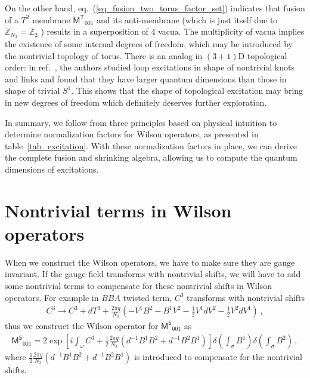 \documentclass[11pt,nofootinbib,preprint]{revtex4-1}
\def\Z{\mathbb{Z}}
\begin{document}
On the other hand, eq.~(\ref{eq_fusion_two_torus_factor_set}) indicates that fusion of a $T^2$ membrane ${\mathsf{M}^{\mathsf{T}}}_{001} $ and its anti-membrane (which is just itself due to $\mathbb{Z}_{N_3}=\Z_2$ ) results in a superposition of 4 vacua. The multiplicity of vacua implies the existence of some internal degrees of freedom, which may be introduced by the nontrivial topology of torus. There is an analog in $\left(3+1\right)$D topological order: in ref.~\cite{ypdw}, the authors studied loop excitations in shape of nontrivial knots and links and found that they have larger quantum dimensions than those in shape of trivial $S^1$. This shows that the shape of topological excitation may bring in new degrees of freedom which definitely deserves further exploration. 

In summary, we follow from three principles based on physical intuition to determine normalization factors for Wilson operators, as presented in table~\ref{tab_excitation}. With these normalization factors in place, we can derive the complete fusion and shrinking algebra, allowing us to compute the quantum dimensions of excitations.


\section{Nontrivial terms in Wilson operators\label{ap1}}
When we construct the Wilson operators, we have to make sure they are gauge invariant. If the gauge field transforms with nontrivial shifts, we will have to add some nontrivial terms to compensate for these nontrivial shifts in Wilson operators. For example in $BBA$ twisted term, $C^3$ transforms with nontrivial shifts
\begin{align}
	C^3\rightarrow C^3+dT^3+\frac{2\pi q}{N_3}\left( -V^1B^2-B^1V^2-\frac{1}{2}V^1dV^2-\frac{1}{2}V^2dV^1 \right) \,,
\end{align}
thus we construct the Wilson operator for $\mathsf{M^S}_{001}$ as 
\begin{align}
	\mathsf{M^S}_{001}=2\exp \left[ i\int_{\omega}{C^3+\frac{1}{2}\frac{2\pi q}{N_3}\left( d^{-1}B^1B^2+d^{-1}B^2B^1 \right)} \right] \delta \left( \int_{\sigma}{B^1} \right) \delta \left( \int_{\sigma}{B^2} \right) \,,
\end{align}
where $\frac{1}{2}\frac{2\pi q}{N_3}\left( d^{-1}B^1B^2+d^{-1}B^2B^1 \right)$ is introduced to compensate for the nontrivial shifts.
\end{document}
